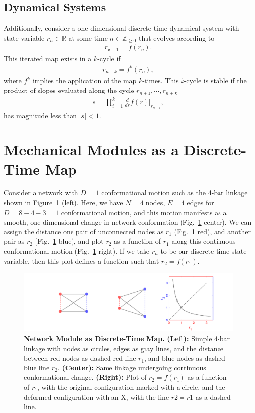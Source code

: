 \documentclass[12pt]{revtex4-1}
\newcommand{\real}{\mathbb{R}}
\begin{document}
\subsection{Dynamical Systems}
Additionally, consider a one-dimensional discrete-time dynamical system with state variable $r_n \in \real$ at some time $n \in \mathbb{Z}_{\geq 0}$ that evolves according to
\begin{align*}
r_{n+1} = f(r_n). 
\end{align*}
This iterated map exists in a $k$-cycle if
\begin{align*}
r_{n+k} = f^k(r_n),
\end{align*}
where $f^k$ implies the application of the map $k$-times. This $k$-cycle is stable if the product of slopes evaluated along the cycle $r_{n+1},\dotsm,r_{n+k}$
\begin{align*}
s = \prod_{i=1}^k \frac{d}{dr}f(r)\bigg|_{r_{n+i}},
\end{align*}
has magnitude less than $|s| < 1$. 




\section{Mechanical Modules as a Discrete-Time Map}
Consider a network with $D = 1$ conformational motion such as the 4-bar linkage shown in Figure~\ref{fig:4bar} (left). Here, we have $N=4$ nodes, $E = 4$ edges for $D = 8-4-3 = 1$ conformational motion, and this motion manifests as a smooth, one dimensional change in network conformation (Fig.~\ref{fig:4bar} center). We can assign the distance one pair of unconnected nodes as $r_1$ (Fig.~\ref{fig:4bar} red), and another pair as $r_2$ (Fig.~\ref{fig:4bar} blue), and plot $r_2$ as a function of $r_1$ along this continuous conformational motion (Fig.~\ref{fig:4bar} right). If we take $r_n$ to be our discrete-time state variable, then this plot defines a function such that $r_2 = f(r_1)$. 

\begin{figure}[h!]
	\centering
	\includegraphics[width=1.0\columnwidth]{4bar.pdf}
	\caption{\textbf{Network Module as Discrete-Time Map.} \textbf{(Left):} Simple 4-bar linkage with nodes as circles, edges as gray lines, and the distance between red nodes as dashed red line $r_1$, and blue nodes as dashed blue line $r_2$. \textbf{(Center):} Same linkage undergoing continuous conformational change. \textbf{(Right):} Plot of $r_2 = f(r_1)$ as a function of $r_1$, with the original configuration marked with a circle, and the deformed configuration with an X, with the line $r2 = r1$ as a dashed line.}
	\label{fig:4bar}
\end{figure}
\end{document}
